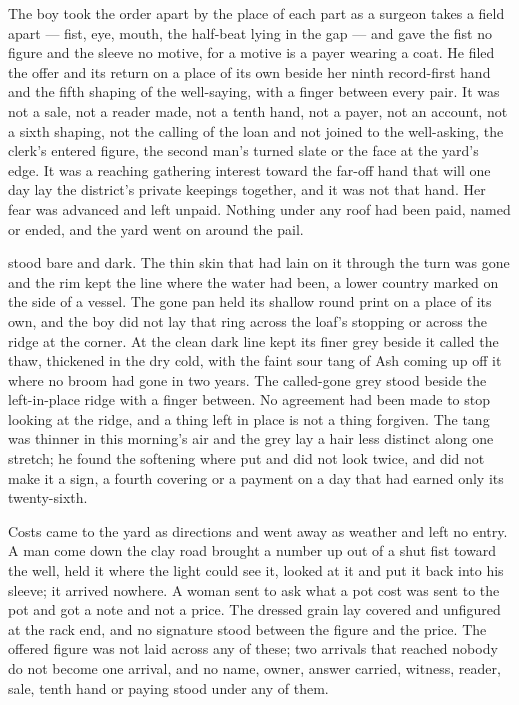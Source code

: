 The boy took the order apart by the place of each part as a surgeon takes a field apart --- fist, eye, mouth, the half-beat lying in the gap --- and gave the fist no figure and the sleeve no motive, for a motive is a payer wearing a coat. He filed the offer and its return on a place of its own beside her ninth record-first hand and the fifth shaping of the well-saying, with a finger between every pair. It was not a sale, not a reader made, not a tenth hand, not a payer, not an account, not a sixth shaping, not the calling of the loan and not joined to the well-asking, the clerk's entered figure, the second man's turned slate or the face at the yard's edge. It was a reaching gathering interest toward the far-off hand that will one day lay the district's private keepings together, and it was not that hand. Her fear was advanced and left unpaid. Nothing under any roof had been paid, named or ended, and the yard went on around the pail.

\scenebreak

 stood bare and dark. The thin skin that had lain on it through the turn was gone and the rim kept the line where the water had been, a lower country marked on the side of a vessel. The gone pan held its shallow round print on a place of its own, and the boy did not lay that ring across the loaf's stopping or across the ridge at the corner. At  the clean dark line kept its finer grey beside it called the thaw, thickened in the dry cold, with the faint sour tang of Ash coming up off it where no broom had gone in two years. The called-gone grey stood beside the left-in-place ridge with a finger between. No agreement had been made to stop looking at the ridge, and a thing left in place is not a thing forgiven. The tang was thinner in this morning's air and the grey lay a hair less distinct along one stretch; he found the softening where put and did not look twice, and did not make it a sign, a fourth covering or a payment on a day that had earned only its twenty-sixth.

Costs came to the yard as directions and went away as weather and left no entry. A man come down the clay road brought a number up out of a shut fist toward the well, held it where the light could see it, looked at it and put it back into his sleeve; it arrived nowhere. A woman sent to ask what a pot cost was sent to the pot and got a note and not a price. The dressed grain lay covered and unfigured at the rack end, and no signature stood between the figure and the price. The offered figure was not laid across any of these; two arrivals that reached nobody do not become one arrival, and no name, owner, answer carried, witness, reader, sale, tenth hand or paying stood under any of them.

